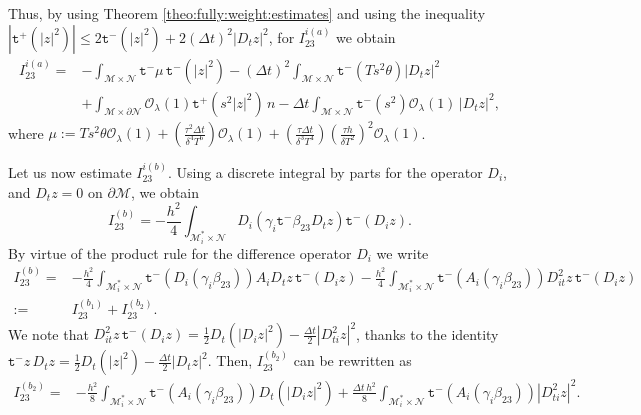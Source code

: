 \documentclass[11pt,oneside,leqno]{amsart}
\numberwithin{equation}{section}
\numberwithin{equation}{section}
\newcommand{\trp}{\mathtt t^+}
\newcommand{\trm}{\mathtt t^-}
\begin{document}
Thus, by using Theorem \ref{theo:fully:weight:estimates} and using the inequality $|\trp(|z|^{2})|\leq 2\trm(|z|^{2})+2(\Delta t)^{2}|D_{t}z|^{2}$, for $I_{23}^{i(a)}$ we obtain
\begin{equation}\label{ine:I:23:a}
    \begin{aligned}
    I_{23}^{i(a)}=&-\int_{\mathcal{M}\times\mathcal{N}}\trm\mu\,\trm(|z|^{2})-(\Delta t)^{2}\int_{\mathcal{M}\times\mathcal{N}}\trm(Ts^{2}\theta)|D_{t}z|^{2}\\
    &+\int_{\mathcal{M}\times\partial\mathcal{N}}\mathcal{O}_{\lambda}(1)\trp(s^{2}|z|^{2})\,n-\Delta t\int_{\mathcal{M}\times\mathcal{N}}\trm(s^{2})\mathcal{O}_{\lambda}(1)\,|D_{t}z|^{2},
    \end{aligned}
\end{equation}
where $\mu:=Ts^{2}\theta\mathcal{O}_{\lambda}(1)+\left(\frac{\tau^{2}\Delta t}{\delta^{4}T^{6}}\right)\mathcal{O}_{\lambda}(1)+\left(\frac{\tau \Delta t}{\delta^{3}T^{4}}\right)\left(\frac{\tau h}{\delta T^{2}}\right)^{2}\mathcal{O}_{\lambda}(1)$.
\par Let us now estimate $I_{23}^{i(b)}$. Using a discrete integral by parts for the operator $D_{i}$, and $D_{t}z=0$ on $\partial\mathcal{M}$, we obtain
\begin{equation*}
    I_{23}^{(b)}=-\frac{h^{2}}{4}\int_{\mathcal{M}_{i}^{\ast}\times\mathcal{N}}D_{i}(\gamma_{i}\trm\beta_{23}D_{t}z)\trm(D_{i}z).
\end{equation*}
By virtue of the product rule for the difference operator $D_{i}$ we write
\begin{equation*}
\begin{split}
    I_{23}^{(b)}=&-\frac{h^{2}}{4}\int_{\mathcal{M}_{i}^{\ast}\times\mathcal{N}}\trm(D_{i}(\gamma_{i}\beta_{23}))A_{i}D_{t}z\,\trm(D_{i}z)-\frac{h^{2}}{4}\int_{\mathcal{M}_{i}^{\ast}\times\mathcal{N}}\trm(A_{i}(\gamma_{i}\beta_{23}))D^{2}_{it}z\,\trm(D_{i}z)\\
    :=&I_{23}^{(b_{1})}+I_{23}^{(b_{2})}.
    \end{split}
\end{equation*}
We note that $D_{it}^{2}z\,\trm(D_{i}z)=\frac{1}{2}D_{t}(|D_{i}z|^{2})-\frac{\Delta t}{2}|D^{2}_{ti}z|^{2}$, thanks to the identity $\trm z\,D_{t}z=\frac{1}{2}D_{t}(|z|^{2})-\frac{\Delta t}{2}|D_{t}z|^{2}$. Then, $I_{23}^{(b_{2})}$ can be rewritten as
\begin{equation}
\begin{aligned}
    I_{23}^{(b_{2})}=&-\frac{h^{2}}{8}\int_{\mathcal{M}_{i}^{\ast}\times\mathcal{N}}\trm(A_{i}(\gamma_{i}\beta_{23}))D_{t}(|D_{i}z|^{2})+\frac{\Delta t\,h^{2}}{8}\int_{\mathcal{M}_{i}^{\ast}\times\mathcal{N}}\trm(A_{i}(\gamma_{i}\beta_{23})) 
    |D^{2}_{ti}z|^{2}.
    \end{aligned}
\end{equation}
\end{document}
